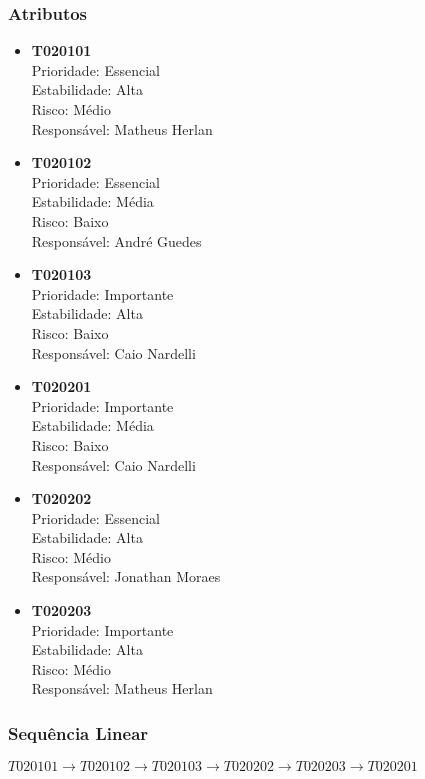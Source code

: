 	\subsubsection[Atributos]{Atributos}
	\label{subsubsec:requisitos_priorizacao_time_atributos}
		\begin{itemize}
			\item{\textbf{T020101}
			\\ Prioridade: Essencial
			\\ Estabilidade: Alta
			\\ Risco: Médio
			\\ Responsável: Matheus Herlan}
			\item{\textbf{T020102}
			\\ Prioridade: Essencial
			\\ Estabilidade: Média
			\\ Risco: Baixo
			\\ Responsável: André Guedes}
			\item{\textbf{T020103}
			\\ Prioridade: Importante
			\\ Estabilidade: Alta
			\\ Risco: Baixo
			\\ Responsável: Caio Nardelli}
			\item{\textbf{T020201}
			\\ Prioridade: Importante
			\\ Estabilidade: Média
			\\ Risco: Baixo
			\\ Responsável: Caio Nardelli}
			\item{\textbf{T020202}
			\\ Prioridade: Essencial
			\\ Estabilidade: Alta
			\\ Risco: Médio
			\\ Responsável: Jonathan Moraes}
			\item{\textbf{T020203}
			\\ Prioridade: Importante
			\\ Estabilidade: Alta
			\\ Risco: Médio
			\\ Responsável: Matheus Herlan}
		\end{itemize}

	\subsubsection[Sequência Linear]{Sequência Linear}
	\label{subsubsec:requisitos_priorizacao_time_sequencia}
		\begin{center}
		$T020101 \rightarrow T020102 \rightarrow T020103 \rightarrow T020202 \rightarrow T020203 \rightarrow T020201$
		\end{center}